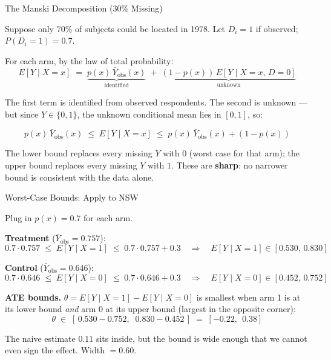 \documentclass[handout, aspectratio=169]{beamer}
\numberwithin{equation}{section}
\begin{document}
\begin{frame}{The Manski Decomposition (30\% Missing)}

Suppose only 70\% of subjects could be located in 1978.  Let $D_i = 1$ if observed; $P(D_i = 1) = 0.7$.

\pause
\smallskip

For each arm, by the law of total probability:
$$E[Y \mid X = x] \;=\; \underbrace{p(x)\,\bar{Y}_{\text{obs}}(x)}_{\text{identified}} \;+\; \underbrace{(1 - p(x))\,E[Y \mid X = x,\, D = 0]}_{\text{unknown}}$$

\pause
\smallskip

The first term is identified from observed respondents.  The second is unknown — but since $Y \in \{0, 1\}$, the unknown conditional mean lies in $[0, 1]$, so:

$$\boxed{\;\;p(x)\,\bar{Y}_{\text{obs}}(x) \;\leq\; E[Y \mid X = x] \;\leq\; p(x)\,\bar{Y}_{\text{obs}}(x) + (1 - p(x))\;\;}$$

\pause
\smallskip

The lower bound replaces every missing $Y$ with $0$ (worst case for that arm); the upper bound replaces every missing $Y$ with $1$.  These are \textbf{sharp}: no narrower bound is consistent with the data alone.
\end{frame}

\begin{frame}{Worst-Case Bounds: Apply to NSW}

Plug in $p(x) = 0.7$ for each arm.

\pause
\smallskip

\textbf{Treatment} ($\bar{Y}_{\text{obs}} = 0.757$):
$$0.7 \cdot 0.757 \;\leq\; E[Y\mid X{=}1] \;\leq\; 0.7 \cdot 0.757 + 0.3 \quad\Longrightarrow\quad E[Y\mid X{=}1] \in [0.530,\, 0.830]$$

\textbf{Control} ($\bar{Y}_{\text{obs}} = 0.646$):
$$0.7 \cdot 0.646 \;\leq\; E[Y\mid X{=}0] \;\leq\; 0.7 \cdot 0.646 + 0.3 \quad\Longrightarrow\quad E[Y\mid X{=}0] \in [0.452,\, 0.752]$$

\pause
\smallskip

\textbf{ATE bounds.} $\theta = E[Y\mid X{=}1] - E[Y\mid X{=}0]$ is smallest when arm 1 is at its lower bound \emph{and} arm 0 at its upper bound (largest in the opposite corner):
$$\theta \;\in\; [\,0.530 - 0.752,\;\; 0.830 - 0.452\,] \;=\; [-0.22,\;\, 0.38]$$

\pause
\smallskip

The naive estimate $0.11$ sits inside, but the bound is wide enough that we cannot even sign the effect.  Width $= 0.60$.
\end{frame}
\end{document}
